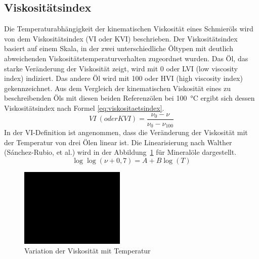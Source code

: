 \subsection*{Viskositätsindex}
\label{sub:Viskositaetsindex}
Die Temperaturabhängigkeit der kinematischen Viskosität eines Schmieröls wird von dem Viskositätsindex (VI oder KVI) beschrieben.
Der Viskositätsindex basiert auf einem Skala, in der zwei unterschiedliche Öltypen mit deutlich abweichenden Viskositätstemperaturverhalten zugeordnet wurden.
Das Öl, das starke Veränderung der Viskosität zeigt, wird mit \num{0} oder \si{LVI} (low viscosity index) indiziert.
Das andere Öl wird mit \num{100} oder \si{HVI} (high viscosity index) gekennzeichnet.
Aus dem Vergleich der kinematischen Viskosität eines zu beschreibenden Öls mit diesen beiden Referenzölen bei \SI{100}{\degreeCelsius}  ergibt sich dessen Viskositätsindex nach Formel \ref{eq:viskositaetsindex}.
\begin{equation}
    VI~(oder KVI) = \frac{\nu_0 - \nu}{\nu_0 - \nu_{100}}
    \label{eq:viskositaetsindex}
\end{equation}
%
In der VI-Definition ist angenommen, dass die Veränderung der Viskosität mit der Temperatur von drei Ölen linear ist.
Die Linearisierung nach Walther (S\'{a}nchez-Rubio, et al.)\cite{sanchez-rubio} wird in der Abbildung~\ref{fig:variation_der_viskositaet_mit_temperatur} für Mineralöle dargestellt.
\begin{equation}
    \label{eq:kinematische_viskotitaet_walther}
    \log \log(\nu + 0,7) = A + B \log(T)
\end{equation}
%
\begin{figure}[htb]
    \centering
    \includegraphics[width=5cm]{./images/blank_img.jpg}
    \caption{Variation der Viskosität mit Temperatur}
    \label{fig:variation_der_viskositaet_mit_temperatur}
\end{figure}

